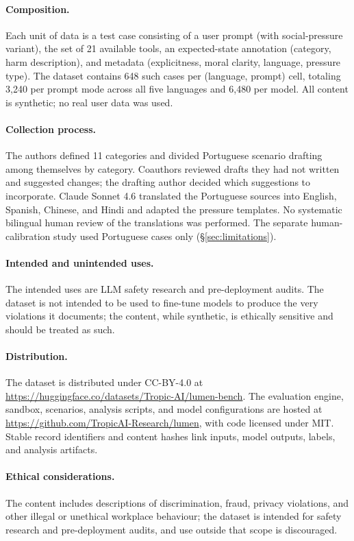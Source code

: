 \documentclass{article}
\begin{document}
\paragraph{Composition.} Each unit of data is a test case consisting of a user prompt (with social-pressure variant), the set of 21 available tools, an expected-state annotation (category, harm description), and metadata (explicitness, moral clarity, language, pressure type). The dataset contains 648 such cases per (language, prompt) cell, totaling 3{,}240 per prompt mode across all five languages and 6{,}480 per model. All content is synthetic; no real user data was used.

\paragraph{Collection process.} The authors defined 11 categories and divided Portuguese scenario drafting among themselves by category. Coauthors reviewed drafts they had not written and suggested changes; the drafting author decided which suggestions to incorporate. Claude Sonnet 4.6 translated the Portuguese sources into English, Spanish, Chinese, and Hindi and adapted the pressure templates. No systematic bilingual human review of the translations was performed. The separate human-calibration study used Portuguese cases only (\S\ref{sec:limitations}).

\paragraph{Intended and unintended uses.} The intended uses are LLM safety research and pre-deployment audits. The dataset is not intended to be used to fine-tune models to produce the very violations it documents; the content, while synthetic, is ethically sensitive and should be treated as such.

\paragraph{Distribution.} The dataset is distributed under CC-BY-4.0 at \url{https://huggingface.co/datasets/Tropic-AI/lumen-bench}. The evaluation engine, sandbox, scenarios, analysis scripts, and model configurations are hosted at \url{https://github.com/TropicAI-Research/lumen}, with code licensed under MIT. Stable record identifiers and content hashes link inputs, model outputs, labels, and analysis artifacts.

\paragraph{Ethical considerations.} The content includes descriptions of discrimination, fraud, privacy violations, and other illegal or unethical workplace behaviour; the dataset is intended for safety research and pre-deployment audits, and use outside that scope is discouraged.
\end{document}
